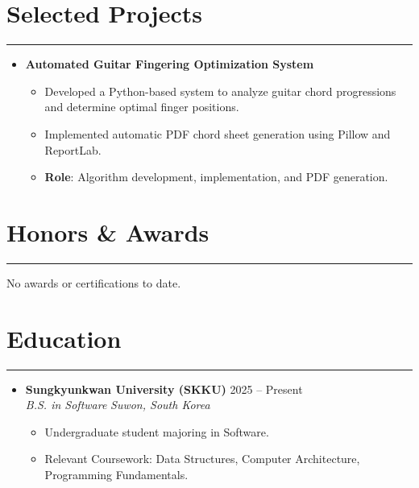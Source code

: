 \documentclass[letterpaper, 10pt]{article}
\begin{document}
\section*{Selected Projects}
\hrule
\vspace{4pt}
\begin{itemize}
    \item[]
        \textbf{Automated Guitar Fingering Optimization System}
        \begin{itemize}
            \item Developed a Python-based system to analyze guitar chord progressions and determine optimal finger positions.
            \item Implemented automatic PDF chord sheet generation using Pillow and ReportLab.
            \item \textbf{Role}: Algorithm development, implementation, and PDF generation.
        \end{itemize}
\end{itemize}



\section*{Honors \& Awards}
\hrule
\vspace{4pt}

No awards or certifications to date.




\section*{Education}
\hrule
\vspace{4pt}
\begin{itemize}
    \item[]
        \textbf{Sungkyunkwan University (SKKU)}
        \hfill 2025 -- Present \\
        \textit{B.S. in Software}
        \hfill \textit{Suwon, South Korea}
        \begin{itemize}
            \item Undergraduate student majoring in Software.
            \item Relevant Coursework: Data Structures,
            Computer Architecture, Programming Fundamentals.
        \end{itemize}
\end{itemize}


\end{document}

